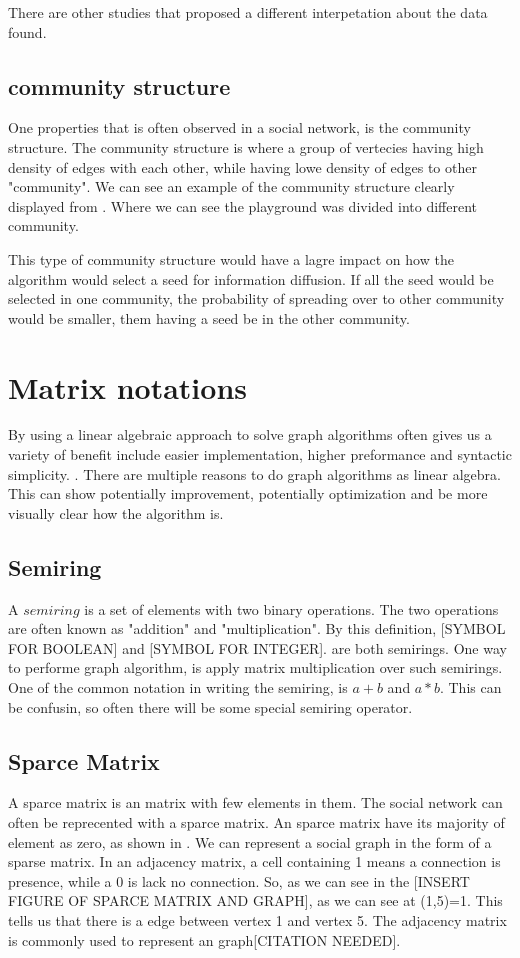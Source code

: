 There are other studies that proposed a different interpetation about the data found.	


\subsection{community structure}
One properties that is often observed in a social network, is the community structure. The community structure is where a group of vertecies having high density of edges with each other, while having lowe density of edges to other "community". We can see an example of the community structure clearly displayed from \cite{RaceSchool2001}. Where we can see the playground was divided into different community.

This type of community structure would have a lagre impact on how the algorithm would select a seed for information diffusion. If all the seed would be selected in one community, the probability of spreading over to other community would be smaller, them having a seed be in the other community.

\section{Matrix notations}
By using a linear algebraic approach to solve graph algorithms often gives us a variety of benefit include easier implementation, higher preformance and syntactic simplicity. \cite{MathToAlgo}. There are multiple reasons to do graph algorithms as linear algebra. This can show potentially improvement, potentially optimization and be more visually clear how the algorithm is. 



\subsection{Semiring}
A $semiring$ is a set of elements with two binary operations. The two operations are often known as "addition" and "multiplication". By this definition, [SYMBOL FOR BOOLEAN] and [SYMBOL FOR INTEGER]. are both semirings.  One way to performe graph algorithm, is apply matrix multiplication over such semirings. One of the common notation in writing the semiring, is $a+b$ and $a \ast b$. This can be confusin, so often there will be some special semiring operator.

\subsection{Sparce Matrix}
A sparce matrix is an matrix with few elements in them. The social network can often be reprecented with a sparce matrix. An sparce matrix have its majority of element as zero, as shown in . We can represent a social graph in the form of a sparse matrix. In an adjacency matrix, a cell containing 1 means a connection is presence, while a 0 is lack no connection. So, as we can see in the [INSERT FIGURE OF SPARCE MATRIX AND GRAPH], as we can see at (1,5)=1. This tells us that there is a edge between vertex 1 and vertex 5. The adjacency matrix is commonly used to represent an graph[CITATION NEEDED].


